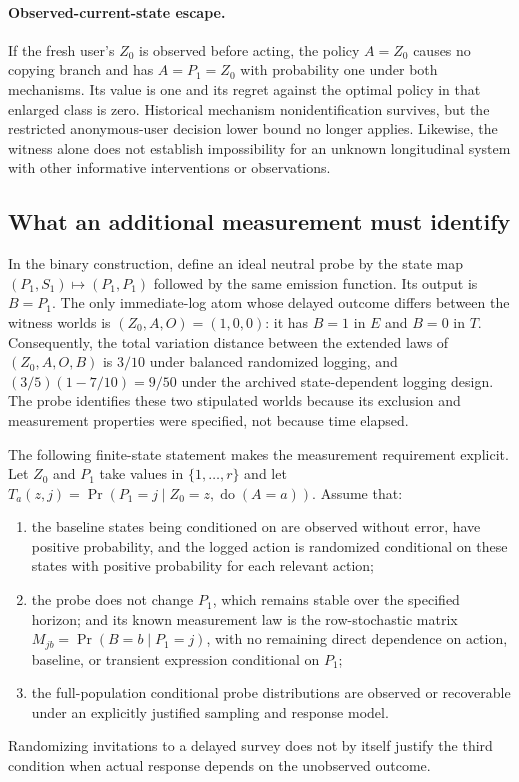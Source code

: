 \paragraph{Observed-current-state escape.}
If the fresh user's $Z_0$ is observed before acting, the policy $A=Z_0$
causes no copying branch and has $A=P_1=Z_0$ with probability one under both
mechanisms. Its value is one and its regret against the optimal policy in
that enlarged class is zero. Historical mechanism nonidentification survives,
but the restricted anonymous-user decision lower bound no longer applies.
Likewise, the witness alone does not establish impossibility for an unknown
longitudinal system with other informative interventions or observations.

\subsection{What an additional measurement must identify}
\label{app:theory:measurement}

In the binary construction, define an ideal neutral probe by the state map
$(P_1,S_1)\mapsto(P_1,P_1)$ followed by the same emission function. Its
output is $B=P_1$. The only immediate-log atom whose delayed outcome differs
between the witness worlds is $(Z_0,A,O)=(1,0,0)$: it has $B=1$ in $E$ and
$B=0$ in $T$. Consequently, the total variation distance between the extended
laws of $(Z_0,A,O,B)$ is $3/10$ under balanced randomized logging, and
$(3/5)(1-7/10)=9/50$ under the archived state-dependent logging design.
The probe identifies these two stipulated worlds because its exclusion and
measurement properties were specified, not because time elapsed.

The following finite-state statement makes the measurement requirement
explicit. Let $Z_0$ and $P_1$ take values in $\{1,\ldots,r\}$ and let
$T_a(z,j)=\Pr(P_1=j\mid Z_0=z,\operatorname{do}(A=a))$. Assume that:
\begin{enumerate}
 \item the baseline states being conditioned on are observed without error,
 have positive probability, and the logged action is randomized conditional
 on these states with positive probability for each relevant action;
 \item the probe does not change $P_1$, which remains stable over the specified
 horizon; and its known measurement law is the row-stochastic matrix
 $M_{jb}=\Pr(B=b\mid P_1=j)$, with no remaining direct dependence on action,
 baseline, or transient expression conditional on $P_1$;
 \item the full-population conditional probe distributions are observed or
 recoverable under an explicitly justified sampling and response model.
\end{enumerate}
Randomizing invitations to a delayed survey does not by itself justify the
third condition when actual response depends on the unobserved outcome.

